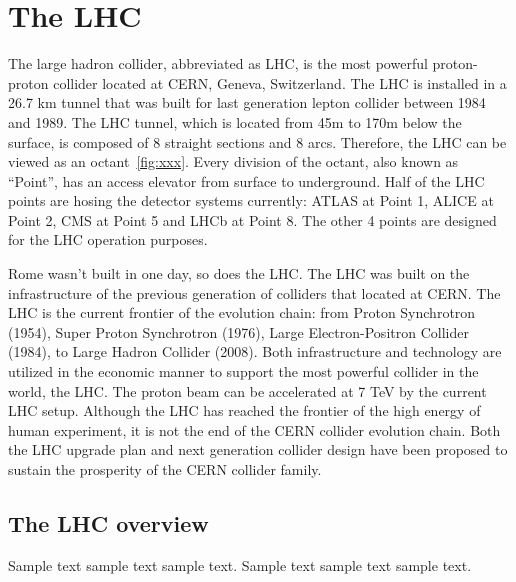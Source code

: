 \chapter{The LHC}
\label{ch:lhc}
\par The large hadron collider, abbreviated as LHC, is the most powerful proton-proton collider located at CERN, Geneva, Switzerland. The LHC is installed in a 26.7 km tunnel that was built for last generation lepton collider between 1984 and 1989. The LHC tunnel, which is located from 45m to 170m below the surface, is composed of 8 straight sections and 8 arcs. Therefore, the LHC can be viewed as an octant~\ref{fig:xxx}. Every division of the octant, also known as “Point”, has an access elevator from surface to underground. Half of the LHC points are hosing the detector systems currently: ATLAS\cite{Aad:2008zzm} at Point 1, ALICE\cite{Aamodt:2008zz} at Point 2, CMS\cite{Chatrchyan:2008aa} at Point 5 and LHCb\cite{Alves:2008zz} at Point 8. The other 4 points are designed for the LHC operation purposes. 

\par Rome wasn’t built in one day, so does the LHC. The LHC was built on the infrastructure of the previous generation of colliders that located at CERN. The LHC is the current frontier of the evolution chain: from Proton Synchrotron (1954)\cite{Gilardoni:2011za}, Super Proton Synchrotron (1976)\cite{Doble:2017syb}, Large Electron-Positron Collider (1984)\cite{LepInjectorStudy:1983aa}\cite{LepInjectorStudy:1983ab}, to Large Hadron Collider (2008)\cite{Bruning:2004ej}\cite{Buning:2004wk}. Both infrastructure and technology are utilized in the economic manner to support the most powerful collider in the world, the LHC. The proton beam can be accelerated at 7 TeV by the current LHC setup. Although the LHC has reached the frontier of the high energy of human experiment, it is not the end of the CERN collider evolution chain. Both the LHC upgrade plan\cite{ApollinariG.:2017ojx} and next generation collider design\cite{Benedikt:2018csr} have been proposed to sustain the prosperity of the CERN collider family.

\section{The LHC overview}
\label{sec:lhcs1}

\par Sample text sample text sample text. Sample text sample text sample text.

